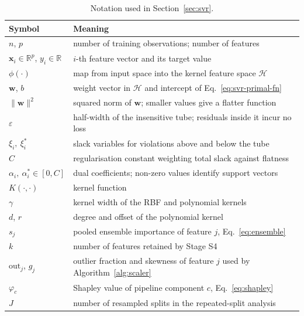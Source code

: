 \begin{table}[htbp]
\centering
\caption{Notation used in Section~\ref{sec:svr}.}\label{tab:notation}
\small
\begin{tabular}{ll}
\toprule
Symbol & Meaning \\
\midrule
$n$, $p$ & number of training observations; number of features \\
$\mathbf{x}_i \in \mathbb{R}^{p}$, $y_i \in \mathbb{R}$ & $i$-th feature vector and its target value \\
$\phi(\cdot)$ & map from input space into the kernel feature space $\mathcal{H}$ \\
$\mathbf{w}$, $b$ & weight vector in $\mathcal{H}$ and intercept of Eq.~\eqref{eq:svr-primal-fn} \\
$\lVert \mathbf{w} \rVert^{2}$ & squared norm of $\mathbf{w}$; smaller values give a flatter function \\
$\varepsilon$ & half-width of the insensitive tube; residuals inside it incur no loss \\
$\xi_i,\ \xi_i^{*}$ & slack variables for violations above and below the tube \\
$C$ & regularisation constant weighting total slack against flatness \\
$\alpha_i,\ \alpha_i^{*} \in [0, C]$ & dual coefficients; non-zero values identify support vectors \\
$K(\cdot,\cdot)$ & kernel function \\
$\gamma$ & kernel width of the RBF and polynomial kernels \\
$d$, $r$ & degree and offset of the polynomial kernel \\
$s_j$ & pooled ensemble importance of feature $j$, Eq.~\eqref{eq:ensemble} \\
$k$ & number of features retained by Stage S4 \\
$\mathrm{out}_j$, $g_j$ & outlier fraction and skewness of feature $j$ used by Algorithm~\ref{alg:scaler} \\
$\varphi_c$ & Shapley value of pipeline component $c$, Eq.~\eqref{eq:shapley} \\
$J$ & number of resampled splits in the repeated-split analysis \\
\bottomrule
\end{tabular}
\end{table}
